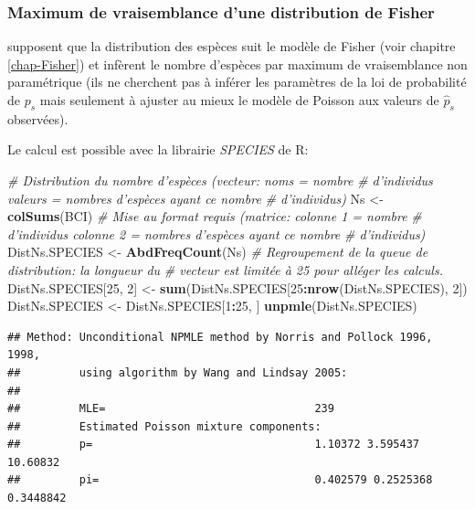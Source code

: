 \documentclass[
  11pt,
  french,
  a4paper,
  extrafontsizes,onecolumn,openright
  ]{memoir}
\newenvironment{Shaded}{\begin{snugshade}}{\end{snugshade}}
\newcommand{\CommentTok}[1]{\textcolor[rgb]{0.56,0.35,0.01}{\textit{#1}}}
\newcommand{\DecValTok}[1]{\textcolor[rgb]{0.00,0.00,0.81}{#1}}
\newcommand{\KeywordTok}[1]{\textcolor[rgb]{0.13,0.29,0.53}{\textbf{#1}}}
\newcommand{\NormalTok}[1]{#1}
\newcommand{\OperatorTok}[1]{\textcolor[rgb]{0.81,0.36,0.00}{\textbf{#1}}}
\newcommand{\StringTok}[1]{\textcolor[rgb]{0.31,0.60,0.02}{#1}}
\begin{document}
\normalsize

\hypertarget{maximum-de-vraisemblance-dune-distribution-de-fisher}{%
\subsubsection{Maximum de vraisemblance d'une distribution de Fisher}\label{maximum-de-vraisemblance-dune-distribution-de-fisher}}

\textcite{Norris1998} supposent que la distribution des espèces suit le modèle de Fisher (voir chapitre \ref{chap-Fisher}) et infèrent le nombre d'espèces par maximum de vraisemblance non paramétrique (ils ne cherchent pas à inférer les paramètres de la loi de probabilité de \(p_s\) mais seulement à ajuster au mieux le modèle de Poisson aux valeurs de \({\hat{p}}_s\) observées).

Le calcul est possible avec la librairie \emph{SPECIES} de R:

\scriptsize

\begin{Shaded}
\begin{Highlighting}[]
\CommentTok{# Distribution du nombre d'espèces (vecteur: noms = nombre}
\CommentTok{# d'individus valeurs = nombres d'espèces ayant ce nombre}
\CommentTok{# d'individus)}
\NormalTok{Ns <-}\StringTok{ }\KeywordTok{colSums}\NormalTok{(BCI)}
\CommentTok{# Mise au format requis (matrice: colonne 1 = nombre}
\CommentTok{# d'individus colonne 2 = nombres d'espèces ayant ce nombre}
\CommentTok{# d'individus)}
\NormalTok{DistNs.SPECIES <-}\StringTok{ }\KeywordTok{AbdFreqCount}\NormalTok{(Ns)}
\CommentTok{# Regroupement de la queue de distribution: la longueur du}
\CommentTok{# vecteur est limitée à 25 pour alléger les calculs.}
\NormalTok{DistNs.SPECIES[}\DecValTok{25}\NormalTok{, }\DecValTok{2}\NormalTok{] <-}\StringTok{ }\KeywordTok{sum}\NormalTok{(DistNs.SPECIES[}\DecValTok{25}\OperatorTok{:}\KeywordTok{nrow}\NormalTok{(DistNs.SPECIES),}
    \DecValTok{2}\NormalTok{])}
\NormalTok{DistNs.SPECIES <-}\StringTok{ }\NormalTok{DistNs.SPECIES[}\DecValTok{1}\OperatorTok{:}\DecValTok{25}\NormalTok{, ]}
\KeywordTok{unpmle}\NormalTok{(DistNs.SPECIES)}
\end{Highlighting}
\end{Shaded}

\begin{verbatim}
## Method: Unconditional NPMLE method by Norris and Pollock 1996, 1998, 
##         using algorithm by Wang and Lindsay 2005: 
## 
##         MLE=                                239 
##         Estimated Poisson mixture components:       
##         p=                                  1.10372 3.595437 10.60832 
##         pi=                                 0.402579 0.2525368 0.3448842
\end{verbatim}
\end{document}
